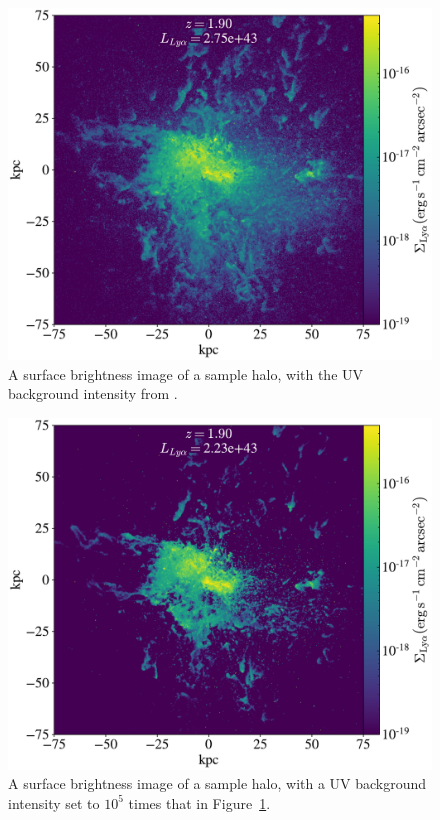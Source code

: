 \begin{figure}
    \centering
    \includegraphics[width=\textwidth,keepaspectratio]{figures/big_uvb_000.pdf}
    \caption{
        A surface brightness image of a sample halo, with the UV background intensity from \citet{Faucher-Giguere2009}.
    }
  \label{fig:big_uv_000}
\end{figure}

\begin{figure}
    \centering
    \includegraphics[width=\textwidth,keepaspectratio]{figures/big_uvb_005.pdf}
    \caption{
        A surface brightness image of a sample halo, with a UV background intensity set to $10^{5}$ times that in Figure~\ref{fig:big_uv_000}.
    }
  \label{fig:big_uv_005}
\end{figure}



